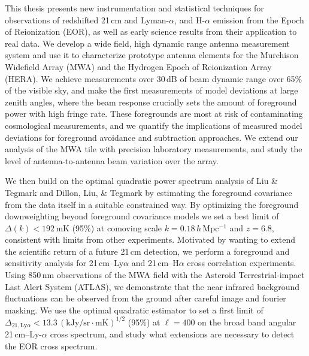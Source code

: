 % 
% 
%

This thesis presents new instrumentation and statistical techniques for observations of redshifted 21\,cm and Lyman-$\alpha$, and H-$\alpha$  emission from the Epoch of Reionization (EOR), as well as early science results from their application to real data. We develop a wide field, high dynamic range antenna measurement system and use it to characterize prototype antenna elements for the Murchison Widefield Array (MWA) and the Hydrogen Epoch of Reionization Array (HERA). We achieve measurements over 30\,dB of beam dynamic range over 65\% of the visible sky, and make the first measurements of model deviations at large zenith angles, where the beam response crucially sets the amount of foreground power with high fringe rate. These foregrounds are most at risk of contaminating cosmological measurements, and we quantify the implications of measured model deviations for foreground avoidance and subtraction approaches. We extend our analysis of the MWA tile with precision laboratory measurements, and study the level of antenna-to-antenna beam variation over the array. 

We then build on the optimal quadratic power spectrum analysis of Liu \& Tegmark and Dillon, Liu, \& Tegmark by estimating the foreground covariance from the data itself in a suitable constrained way. By optimizing the foreground downweighting beyond foreground covariance models we set a best limit of $\Delta(k) < 192$\,mK (95\%) at comoving scale $k = 0.18$\,$h$\,Mpc$^{-1}$ and $z = 6.8$, consistent with limits from other experiments. Motivated by wanting to extend the scientific return of a future 21\,cm detection, we perform a foreground and sensitivity analysis for 21\,cm--Ly$\alpha$ and 21\,cm--H$\alpha$ cross correlation experiments. Using 850\,nm observations of the MWA field with the Asteroid Terrestrial-impact Last Alert System (ATLAS), we demonstrate that the near infrared background fluctuations can be observed from the ground after careful image and fourier masking. We use the optimal quadratic estimator to set a first limit of $\Delta_{21,\text{Ly}\alpha}<13.3\,(\text{kJy/sr}\cdot \text{mK})^{1/2}$ (95\%) at $\ell=400$  on the broad band angular 21\,cm--Ly-$\alpha$ cross spectrum, and study what extensions are necessary to detect the EOR cross spectrum.
